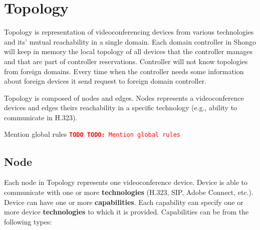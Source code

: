 \documentclass[a4paper]{report}
\newcommand{\TODO}[1]{%
\def\empty{}%
\def\prvniparametr{#1}%
\ifx\prvniparametr\empty%
\begingroup\tt\textcolor{red}{\noindent\textbf{TODO}}\endgroup
\else%
\begingroup\tt\textcolor{red}{\noindent\textbf{TODO:}\ #1}\endgroup
\fi%
}
\begin{document}
\chapter{Topology}

Topology is representation of videoconferencing devices from various 
technologies and its' mutual reachability in a single domain. Each domain 
controller in Shongo will keep in memory the local topology of all devices 
that the controller manages and that are part of controller reservations.
Controller will not know topologies from foreign domains. Every time when the 
controller needs some information about foreign devices it send request to 
foreign domain controller.

Topology is composed of nodes and edges. Nodes represents a videoconference 
devices and edges theirs reachability in a specific technology (e.g., ability 
to communicate in H.323).

\TODO{Mention global rules}

\section{Node}

Each node in Topology represents one videoconference device. Device is able to 
communicate with one or more \textbf{technologies} (H.323, SIP, Adobe Connect, 
etc.).
\\
Device can have one or more \textbf{capabilities}. Each capability can specify 
one or more device \textbf{technologies} to which it is provided. Capabilities 
can be from the following types:
\end{document}
